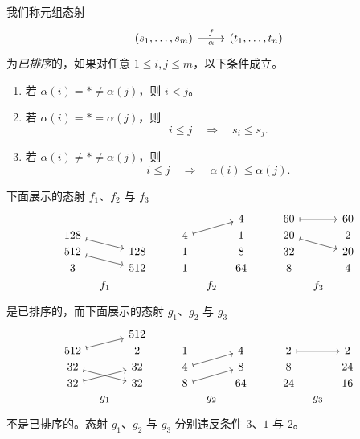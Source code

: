 \begin{definition}\label{definitionofsortedmorphisminC}
    我们称元组态射
    \[\begin{tikzcd} (s_1,\dots,s_m) \ar[r,"f"] \ar[r,swap,"\alpha"] &  (t_1,\dots,t_n) \end{tikzcd} \]
    为{\it 已排序}的，如果对任意 $1 \leq i,j \leq m$，以下条件成立。
    \begin{enumerate}
        \item 若 $\alpha(i) = * \neq \alpha(j)$，则 $i < j$。 
        \item 若 $\alpha(i) = * = \alpha(j)$，则
        \[
        i \leq j \quad \Rightarrow \quad s_i \leq s_j.
        \]
        \item 若 $\alpha(i) \neq * \neq \alpha(j)$，则
        \[
        i \leq j \quad \Rightarrow \quad \alpha(i) \leq \alpha(j).
        \]

    \end{enumerate}
\end{definition}


\begin{example}\label{sortedmorphismsinCexample}
    下面展示的态射 $f_1$、$f_2$ 与 $f_3$
    \[ \begin{tikzcd} [row sep = 1, column sep = 8]
     & & & & &  & & 4 & & & 60 \ar[rr,mapsto] & & 60\\
    128 \ar[drr,mapsto] & & & & & 4 \ar[urr,mapsto] & & 1 & & & 20 \ar[rrd,mapsto] & & 2\\
    512 \ar[drr,mapsto] & & 128 & & & 1 & & 8 & & & 32 & & 20\\
    3 & & 512 & & & 1 & & 64 & & & 8 & & 4 \\
     & f_1 & & & & & f_2 & & & & & f_3 & \\
    \end{tikzcd} \]
    是已排序的，而下面展示的态射 $g_1$、$g_2$ 与 $g_3$
    \[ \begin{tikzcd}[row sep = 1, column sep = 8]
     & & 512 & & & & & & & & & & \\
    512 \ar[urr,mapsto] & & 2 & & & 1  & & 4 & & & 2 \ar[rr,mapsto] & & 2 \\
    32 \ar[drr,mapsto] & & 32 & & & 4 \ar[urr,mapsto] & & 8 & & & 8 & & 24\\
    32 \ar[urr,mapsto] & & 32 & & & 8 \ar[urr,mapsto] & & 64 & & & 24 & & 16 \\
    & g_1 & & & & & g_2 & & & & & g_3 & \\
    \end{tikzcd} \]
    不是已排序的。态射 $g_1$、$g_2$ 与 $g_3$ 分别违反条件 $3$、$1$ 与 $2$。
\end{example}

